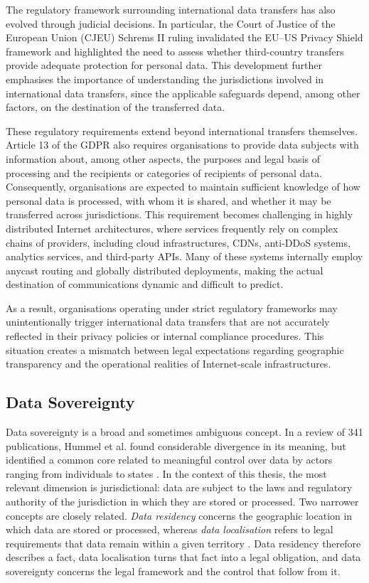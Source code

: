 \documentclass[
A4paper,                %
twoside,                %
openright,              %
chapterprefix=true,     %
12pt,                   %
headings=normal,        %
titlepage=on            %
]{book}
\begin{document}
The regulatory framework surrounding international data transfers has also evolved through judicial decisions. In particular, the Court of Justice of the European Union (CJEU) Schrems II \cite{CourtII} ruling invalidated the EU--US Privacy Shield framework and highlighted the need to assess whether third-country transfers provide adequate protection for personal data. This development further emphasises the importance of understanding the jurisdictions involved in international data transfers, since the applicable safeguards depend, among other factors, on the destination of the transferred data.

These regulatory requirements extend beyond international transfers themselves. Article 13 of the GDPR also requires organisations to provide data subjects with information about, among other aspects, the purposes and legal basis of processing and the recipients or categories of recipients of personal data. Consequently, organisations are expected to maintain sufficient knowledge of how personal data is processed, with whom it is shared, and whether it may be transferred across jurisdictions. This requirement becomes challenging in highly distributed Internet architectures, where services frequently rely on complex chains of providers, including cloud infrastructures, CDNs, anti-DDoS systems, analytics services, and third-party APIs. Many of these systems internally employ anycast routing and globally distributed deployments, making the actual destination of communications dynamic and difficult to predict.

As a result, organisations operating under strict regulatory frameworks may unintentionally trigger international data transfers that are not accurately reflected in their privacy policies or internal compliance procedures. This situation creates a mismatch between legal expectations regarding geographic transparency and the operational realities of Internet-scale infrastructures.

\subsection{Data Sovereignty}
\label{sc:background_privacy_data_sovereignty}

Data sovereignty is a broad and sometimes ambiguous concept. In a review of 341 publications, Hummel et al. found considerable divergence in its meaning, but identified a common core related to meaningful control over data by actors ranging from individuals to states \cite{Hummel2021DataReview}. In the context of this thesis, the most relevant dimension is jurisdictional: data are subject to the laws and regulatory authority of the jurisdiction in which they are stored or processed. Two narrower concepts are closely related. \textit{Data residency} concerns the geographic location in which data are stored or processed, whereas \textit{data localisation} refers to legal requirements that data remain within a given territory \cite{Chander2015DataNationalism}. Data residency therefore describes a fact, data localisation turns that fact into a legal obligation, and data sovereignty concerns the legal framework and the control that follow from it.
\end{document}
